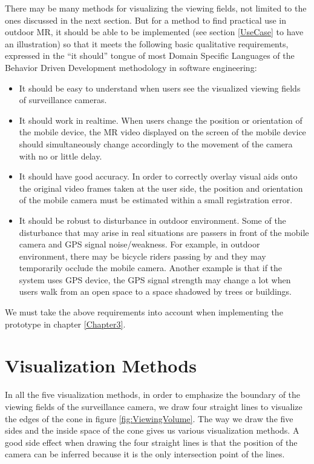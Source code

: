 There may be many methods for visualizing the viewing fields, not limited to the ones discussed in the next section. But for a method to find practical use in outdoor MR, it should be able to be implemented (see section \ref{UseCase} to have an illustration) so that it meets the following basic qualitative requirements, expressed in the ``it should'' tongue of most Domain Specific Languages of the Behavior Driven Development methodology in software engineering:

\begin{itemize}
	\item It should be easy to understand when users see the visualized viewing fields of surveillance cameras.
	\item It should work in realtime. When users change the position or orientation of the mobile device, the MR video displayed on the screen of the mobile device should simultaneously change accordingly to the movement of the camera with no or little delay.
	\item It should have good accuracy. In order to correctly overlay visual aids onto the original video frames taken at the user side, the position and orientation of the mobile camera must be estimated within a small registration error.
	\item It should be robust to disturbance in outdoor environment. Some of the disturbance that may arise in real situations are passers in front of the mobile camera and GPS signal noise/weakness. For example, in outdoor environment, there may be bicycle riders passing by and they may temporarily occlude the mobile camera. Another example is that if the system uses GPS device, the GPS signal strength may change a lot when users walk from an open space to a space shadowed by trees or buildings.
\end{itemize}

We must take the above requirements into account when implementing the prototype in chapter \ref{Chapter3}.


\section{Visualization Methods}
\label{VisualizationMethods}

In all the five visualization methods, in order to emphasize the boundary of the viewing fields of the surveillance camera, we draw four straight lines to visualize the edges of the cone in figure \ref{fig:ViewingVolume}. The way we draw the five sides and the inside space of the cone gives us various visualization methods. A good side effect when drawing the four straight lines is that the position of the camera can be inferred because it is the only intersection point of the lines.

